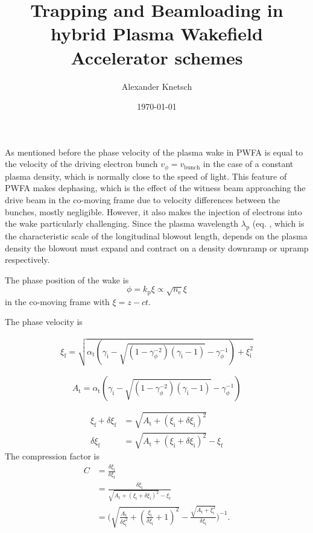 \documentclass{thesis}
\title{Trapping and Beamloading in hybrid Plasma Wakefield Accelerator schemes}
\author{Alexander Knetsch}
\date{\today}
\newcommand{\nE}{n_\mathrm{e}}
\newcommand{\lP}{\lambda_\mathrm{p}}
\newcommand{\kP}{k_\mathrm{p}}
\begin{document}
\maketitle
\tableofcontents


As mentioned before the phase velocity of the plasma wake in PWFA is equal to the velocity of the driving electron bunch $v_\phi=v_\mathrm{bunch}$ in the case of a constant plasma density, which is normally close to the speed of light. This feature of PWFA makes dephasing, which is the effect of the witness beam approaching the drive beam in the co-moving frame due to velocity differences between the bunches, mostly negligible. However, it also makes the injection of electrons into the wake particularly challenging.
Since the plasma wavelength $\lP$ (eq. , which is the characteristic scale of the longitudinal blowout length, depends on the plasma density the blowout must expand and contract on a density downramp or upramp respectively.

The phase position of the wake is
\begin{equation}
\phi=\kP\xi \propto \sqrt{\nE}\xi
\end{equation}
in the co-moving frame with $\xi=z-ct$.

The phase velocity is 


\begin{align}
\xi_\mathrm{f}=\sqrt{\alpha_\mathrm{t}(\gamma_\mathrm{i}-\sqrt{(1-\gamma_\phi^{-2})(\gamma_\mathrm{i}-1) }-\gamma_\phi^{-1})+\xi_\mathrm{i}^2}
\end{align}

\begin{equation}
A_\mathrm{t}=\alpha_\mathrm{t}(\gamma_\mathrm{i}-\sqrt{(1-\gamma_\phi^{-2})(\gamma_\mathrm{i}-1) }-\gamma_\phi^{-1})
\end{equation}

\begin{align}
\xi_\mathrm{f}+\delta \xi_\mathrm{f}&=\sqrt{A_\mathrm{t}+(\xi_\mathrm{i}+\delta\xi_\mathrm{i})^2}\\
\delta \xi_\mathrm{f}&=\sqrt{A_\mathrm{t}+(\xi_\mathrm{i}+\delta\xi_\mathrm{i})^2}-\xi_\mathrm{f}
\end{align}
The compression factor is 
\begin{align}
C&=\frac{\delta \xi_\mathrm{i}}{\delta \xi_\mathrm{f}}\\
&= \frac{\delta \xi_\mathrm{i}}{\sqrt{A_\mathrm{t}+(\xi_\mathrm{i}+\delta\xi_\mathrm{i})^2}-\xi_\mathrm{f}}\\
&=\Bigg(\sqrt{\frac{A_\mathrm{t}}{\delta \xi_\mathrm{i}^2}+(\frac{\xi_\mathrm{i}}{\delta \xi_\mathrm{i}}+1)^2 } -\frac{\sqrt{A_\mathrm{t}+\xi_\mathrm{i}^2}}{\delta\xi_\mathrm{i}}\Bigg)^{-1}.
\end{align}
\end{document}
